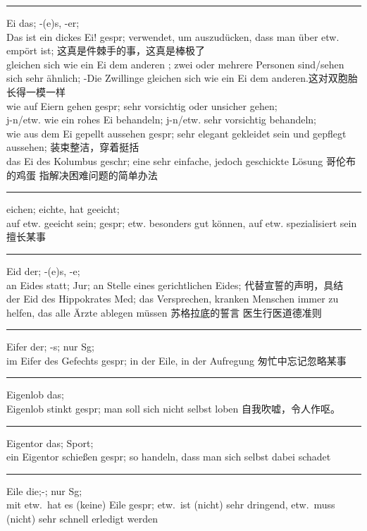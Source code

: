 \noindent\rule{\textwidth}{1pt}
Ei das; -(e)s, -er; \\
Das ist ein dickes Ei! gespr; verwendet, um auszud\"ucken, dass man \"uber etw. emp\"ort ist; 这真是件棘手的事，这真是棒极了\\
gleichen sich wie ein Ei dem anderen ; zwei oder mehrere Personen sind/sehen sich sehr \"ahnlich; -Die Zwillinge gleichen sich wie ein Ei dem anderen.这对双胞胎长得一模一样\\
wie auf Eiern gehen gespr; sehr vorsichtig oder unsicher gehen;\\
j-n/etw. wie ein rohes Ei behandeln; j-n/etw. sehr vorsichtig behandeln; \\
wie aus dem Ei gepellt aussehen gespr; sehr elegant gekleidet sein und gepflegt aussehen; 装束整洁，穿着挺括\\
das Ei des Kolumbus geschr; eine sehr einfache, jedoch geschickte L\"osung 哥伦布的鸡蛋 指解决困难问题的简单办法\\

\noindent\rule{\textwidth}{1pt}
eichen; eichte, hat geeicht; \\
auf etw. geeicht sein; gespr; etw. besonders gut k\"onnen, auf etw. spezialisiert sein 擅长某事\\

\noindent\rule{\textwidth}{1pt}
Eid der; -(e)s, -e; \\
an Eides statt; Jur; an Stelle eines gerichtlichen Eides; 代替宣誓的声明，具结\\
der Eid des Hippokrates Med; das Versprechen, kranken Menschen immer zu helfen, das alle \"Arzte ablegen m\"ussen 苏格拉底的誓言 医生行医道德准则\\

\noindent\rule{\textwidth}{1pt}
Eifer der; -s; nur Sg; \\
im Eifer des Gefechts gespr; in der Eile, in der Aufregung 匆忙中忘记忽略某事 \\

\noindent\rule{\textwidth}{1pt}
Eigenlob das; \\
Eigenlob stinkt gespr; man soll sich nicht selbst loben 自我吹嘘，令人作呕。\\

\noindent\rule{\textwidth}{1pt}
Eigentor das; Sport; \\
ein Eigentor schie\ss{}en gespr; so handeln, dass man sich selbst dabei schadet\\

\noindent\rule{\textwidth}{1pt}
Eile die;-; nur Sg; \\
mit etw.\ hat es (keine) Eile gespr; etw.\ ist (nicht) sehr dringend, etw.\ muss (nicht) sehr schnell erledigt werden \\

